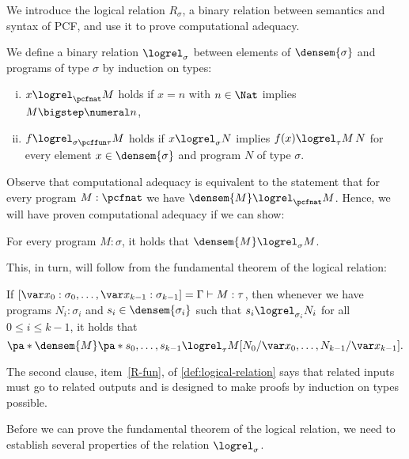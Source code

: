 We introduce the logical relation \(R_\sigma\), a binary relation between
semantics and syntax of PCF, and use it to prove computational adequacy.

\begin{definition}\label{def:logical-relation}
  We define a binary relation \(\logrel_\sigma\) between elements of
  \(\densem{\sigma}\) and programs of type \(\sigma\) by induction on types:
  \begin{enumerate}[(i)]
  \item\label{R-nat} \({x \logrel_{\pcfnat} M}\) holds if \(x = n\) with
    \(n \in \Nat\) implies \(M \bigstep \numeral n\),
  \item\label{R-fun} \(f \logrel_{\sigma \pcffun \tau} M\) holds if \(x \logrel_\sigma N\)
    implies \({f(x)} \logrel_\tau {M \, N}\) for every element
    \(x \in \densem{\sigma}\) and program \(N\) of type \(\sigma\). \qedhere
  \end{enumerate}
\end{definition}

Observe that computational adequacy is equivalent to the statement that for
every program \(M : \pcfnat\) we have \(\densem{M} \logrel_\pcfnat M\).
%
Hence, we will have proven computational adequacy if we can show:

\begin{lemma*}
  For every program \(M : \sigma\), it holds that \(\densem{M} \logrel_\sigma M\).
\end{lemma*}

This, in turn, will follow from the fundamental theorem of the logical relation:

\begin{lemma*}\label{fundamental-theorem}
  If
  \([\var x_0 : \sigma_0 , \dots , \var x_{k-1} : \sigma_{k-1}] = \Gamma \vdash
  M : \tau\), then whenever we have programs \(N_i : \sigma_i\) and
  \(s_i \in \densem{\sigma_i}\) such that \(s_i \logrel_{\sigma_i} N_i\) for
  all \(0 \leq i \leq k-1\), it holds that
  \[
    \pa*{\densem{M}\pa*{s_0,\dots,s_{k-1}}} \logrel_{\tau} {M[N_0/\var x_0,\dots,N_{k-1}/\var x_{k-1}]}.
  \]
\end{lemma*}

The second clause, item~\ref{R-fun}, of \cref{def:logical-relation} says that
related inputs must go to related outputs and is designed to make proofs by
induction on types possible.

Before we can prove the fundamental theorem of the logical relation, we need to
establish several properties of the relation \(\logrel_\sigma\).

